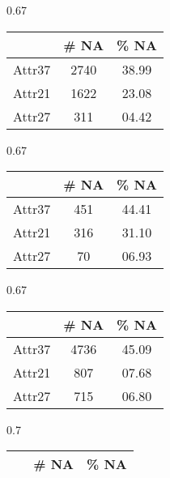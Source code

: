 \begin{table*}[htbp]
\centering
\begin{subtable}[t]{0.67\columnwidth}
    \begin{tabular}{ccc}
        \hline
         ~ & \textbf{\# NA} & \textbf{\% NA} \\
         \hline
        Attr37 & 2740 & 38.99 \\
        Attr21 & 1622 & 23.08 \\
        Attr27 & 311 & 04.42 \\
        \hline
    \end{tabular}
    \caption{\label{tab::attr_missing_1} Year 1}
    
\end{subtable}
 \hfill
\begin{subtable}[t]{0.67\columnwidth}
    \begin{tabular}{ccc}
        \hline
         ~ & \textbf{\# NA} & \textbf{\% NA} \\
         \hline
        
        Attr37 & 451 & 44.41 \\
        Attr21 & 316 & 31.10 \\
        Attr27 & 70 & 06.93 \\

        \hline
    \end{tabular}
    \caption{\label{tab::attr_missing_2} Year 2}
    
\end{subtable}
\hfill\vspace{0.7cm}
\begin{subtable}[t]{0.67\columnwidth}
    \begin{tabular}{ccc}
        \hline
         ~ & \textbf{\# NA} & \textbf{\% NA} \\
         \hline
         
        Attr37 & 4736 & 45.09 \\
        Attr21 & 807 & 07.68 \\
        Attr27 & 715 & 06.80 \\

        \hline
    \end{tabular}
    \caption{\label{tab::attr_missing_3} Year 3}
    
\end{subtable}
\vspace{1cm}
\begin{subtable}[t]{0.7\columnwidth}
    \begin{tabular}{ccc}
        \hline
         ~ & \textbf{\# NA} & \textbf{\% NA} \\
         \hline
         

\end{tabular}
\end{subtable}
\end{table*}
